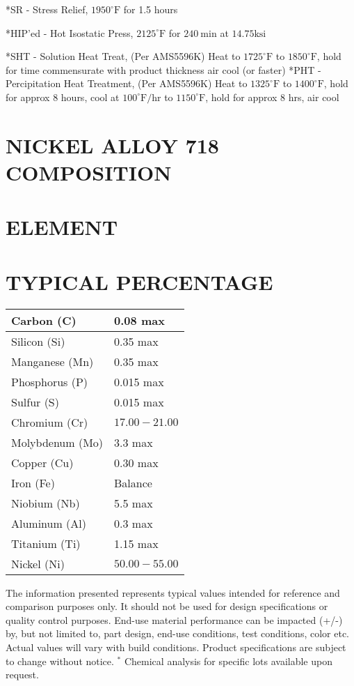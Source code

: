 \documentclass[10pt]{article}
\begin{document}
*SR - Stress Relief, $1950^{\circ} \mathrm{F}$ for 1.5 hours

*HIP'ed - Hot Isostatic Press, $2125^{\circ} \mathrm{F}$ for $240 \mathrm{~min}$ at $14.75 \mathrm{ksi}$

*SHT - Solution Heat Treat, (Per AMS5596K) Heat to $1725^{\circ} \mathrm{F}$ to $1850^{\circ} \mathrm{F}$, hold for time commensurate with product thickness air cool (or faster) *PHT - Percipitation Heat Treatment, (Per AMS5596K) Heat to $1325^{\circ} \mathrm{F}$ to $1400^{\circ} \mathrm{F}$, hold for approx 8 hours, cool at $100^{\circ} \mathrm{F} / \mathrm{hr}$ to $1150^{\circ} \mathrm{F}$, hold for approx 8 hrs, air cool

\section*{NICKEL ALLOY 718 COMPOSITION}
\section*{ELEMENT}
\section*{TYPICAL PERCENTAGE}
\begin{center}
\begin{tabular}{|l|l|}
\hline
Carbon (C) & 0.08 max \\
\hline
Silicon (Si) & 0.35 max \\
\hline
Manganese (Mn) & 0.35 max \\
\hline
Phosphorus (P) & 0.015 max \\
\hline
Sulfur (S) & 0.015 max \\
\hline
Chromium (Cr) & $17.00-21.00$ \\
\hline
Molybdenum (Mo) & 3.3 max \\
\hline
Copper (Cu) & 0.30 max \\
\hline
Iron (Fe) & Balance \\
\hline
Niobium (Nb) & 5.5 max \\
\hline
Aluminum (Al) & 0.3 max \\
\hline
Titanium (Ti) & 1.15 max \\
\hline
Nickel (Ni) & $50.00-55.00$ \\
\hline
\end{tabular}
\end{center}

The information presented represents typical values intended for reference and comparison purposes only. It should not be used for design specifications or quality control purposes. End-use material performance can be impacted (+/-) by, but not limited to, part design, end-use conditions, test conditions, color etc. Actual values will vary with build conditions. Product specifications are subject to change without notice. ${ }^{*}$ Chemical analysis for specific lots available upon request.
\end{document}
